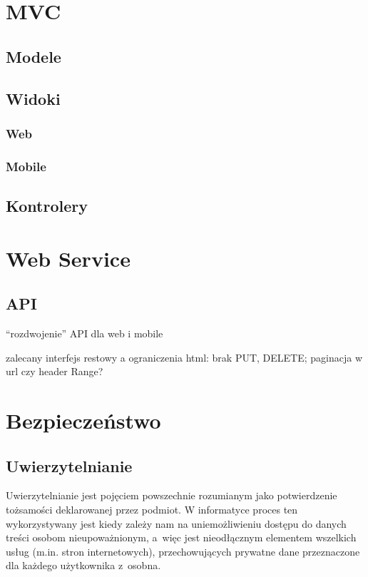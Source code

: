 \documentclass[11pt]{aghdpl}
\begin{document}
\section{MVC}

\subsection{Modele}

\subsection{Widoki}


\subsubsection{Web}

\subsubsection{Mobile}

\subsection{Kontrolery}


\section{Web Service}

\subsection{API}

``rozdwojenie'' API dla web i mobile

zalecany interfejs restowy a ograniczenia html: brak PUT, DELETE; paginacja w url czy header Range?

\section{Bezpieczeństwo}

\subsection{Uwierzytelnianie}

Uwierzytelnianie jest pojęciem powszechnie rozumianym jako potwierdzenie tożsamości deklarowanej przez podmiot. W informatyce proces ten wykorzystywany jest kiedy zależy nam na uniemożliwieniu dostępu do danych treści osobom nieupoważnionym, a~więc jest nieodłącznym elementem wszelkich usług (m.in. stron internetowych), przechowujących prywatne dane przeznaczone dla każdego użytkownika z~osobna.
\end{document}
